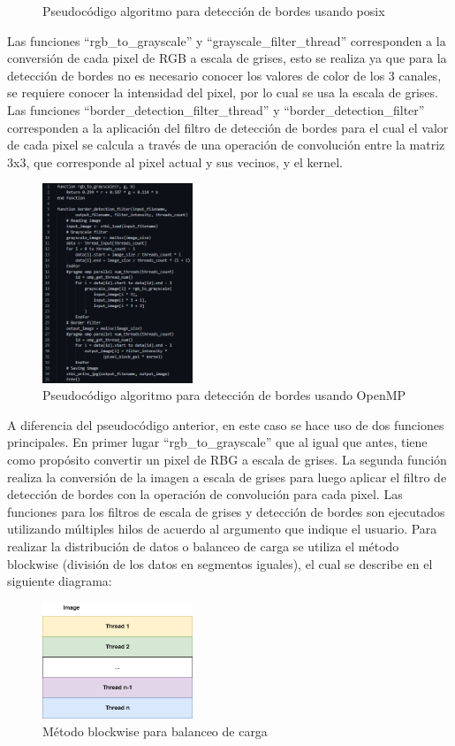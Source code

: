 \begin{itemize}
\begin{figure}[H]
        \caption{Pseudocódigo algoritmo para detección de bordes usando posix}
    \end{figure}
    Las funciones ``rgb\_to\_grayscale'' y ``grayscale\_filter\_thread'' corresponden a la conversión de cada pixel de RGB a escala de grises, esto se realiza ya que para la detección de bordes no es necesario conocer los valores de color de los 3 canales, se requiere conocer la intensidad del pixel, por lo cual se usa la escala de grises. Las funciones ``border\_detection\_filter\_thread'' y ``border\_detection\_filter'' corresponden a la aplicación del filtro de detección de bordes para el cual el valor de cada pixel se calcula a través de una operación de convolución entre la matriz 3x3, que corresponde al pixel actual y sus vecinos, y el kernel.
    \begin{figure}[H]
        \centering
        \includegraphics[width=0.4\textwidth]{../plots/pseudocode_omp.PNG}
        \caption{Pseudocódigo algoritmo para detección de bordes usando OpenMP}
    \end{figure}
    A diferencia del pseudocódigo anterior, en este caso se hace uso de dos funciones principales. En primer lugar ``rgb\_to\_grayscale'' que al igual que antes, tiene como propósito convertir un pixel de RBG a escala de grises. La segunda función realiza la conversión de la imagen a escala de grises para luego aplicar el filtro de detección de bordes con la operación de convolución para cada pixel.
    \newpage
    Las funciones para los filtros de escala de grises y detección de bordes son ejecutados utilizando múltiples hilos de acuerdo al argumento que indique el usuario. Para realizar la distribución de datos o balanceo de carga se utiliza el método blockwise (división de los datos en segmentos iguales), el cual se describe en el siguiente diagrama:
    \begin{figure}[H]
        \centering
        \includegraphics[width=0.4\textwidth]{../plots/load_balancing.drawio.png}
        \caption{Método blockwise para balanceo de carga}
    \end{figure}
\end{itemize}

